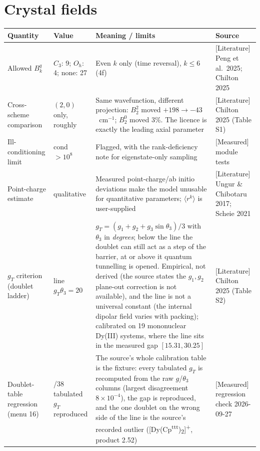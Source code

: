 \section{Crystal fields}

\begin{center}
\begin{tabularx}{\textwidth}{@{}>{\raggedright\arraybackslash}p{3.2cm} >{\raggedright\arraybackslash}p{2.0cm} X >{\raggedright\arraybackslash}p{3.2cm}@{}}
\toprule
Quantity & Value & Meaning / limits & Source \\
\midrule
Allowed $B_k^q$ & $C_3$: 9; $O_h$: 4; none: 27 & Even $k$ only (time reversal),
  $k \le 6$ (4f) & \textsf{[Literature]} Peng et al.\ 2025; Chilton 2025 \\
Cross-scheme comparison & $(2,0)$ only, roughly & Same wavefunction, different
  projection: $B_2^2$ moved $+198 \to -43$~cm$^{-1}$; $B_2^0$ moved 3\%. The
  licence is exactly the leading axial parameter & \textsf{[Literature]}
  Chilton 2025 (Table S1) \\
Ill-conditioning limit & cond $> 10^8$ & Flagged, with the rank-deficiency note
  for eigenstate-only sampling & \textsf{[Measured]} module tests \\
Point-charge estimate & qualitative & Measured point-charge/ab initio
  deviations make the model unusable for quantitative parameters; $\langle
  r^k\rangle$ is user-supplied & \textsf{[Literature]} Ungur \& Chibotaru 2017;
  Scheie 2021 \\
$g_T$ criterion (doublet ladder) & line $g_T\theta_3 = 20$ &
  $g_T = (g_1 + g_2 + g_3 \sin\theta_3) / 3$ with $\theta_3$ in
  \emph{degrees}; below the line the doublet can still act as a step of the
  barrier, at or above it quantum tunnelling is opened. Empirical, not derived
  (the source states the $g_1,g_2$ plane-out correction is not available), and
  the line is not a universal constant (the internal dipolar field varies with
  packing); calibrated on 19 mononuclear Dy(III) systems, where the line sits in
  the measured gap $[15.31, 30.25]$ & \textsf{[Literature]} Chilton 2025
  (Table S2) \\
Doublet-table regression (menu 16) & 38/38 tabulated $g_T$ reproduced & The
  source's whole calibration table is the fixture: every tabulated $g_T$ is
  recomputed from the raw $g$/$ \theta_3$ columns (largest disagreement
  $8\times10^{-4}$), the gap is reproduced, and the one doublet on the wrong
  side of the line is the source's recorded outlier
  ([Dy(Cp\textsuperscript{ttt})\textsubscript{2}]\textsuperscript{+}, product
  2.52) & \textsf{[Measured]} regression check 2026-09-27 \\
\bottomrule
\end{tabularx}
\end{center}

